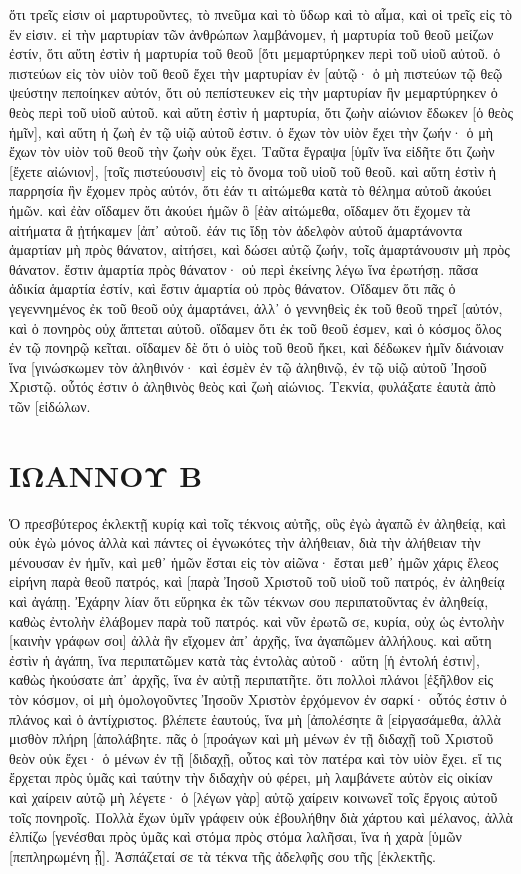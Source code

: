 ὅτι τρεῖς εἰσιν οἱ μαρτυροῦντες, 
τὸ πνεῦμα καὶ τὸ ὕδωρ καὶ τὸ αἷμα, καὶ οἱ τρεῖς εἰς τὸ ἕν εἰσιν. 
εἰ τὴν μαρτυρίαν τῶν ἀνθρώπων λαμβάνομεν, ἡ μαρτυρία τοῦ θεοῦ μείζων ἐστίν, ὅτι αὕτη ἐστὶν ἡ μαρτυρία τοῦ θεοῦ [ὅτι μεμαρτύρηκεν περὶ τοῦ υἱοῦ αὐτοῦ. 
ὁ πιστεύων εἰς τὸν υἱὸν τοῦ θεοῦ ἔχει τὴν μαρτυρίαν ἐν [αὑτῷ· ὁ μὴ πιστεύων τῷ θεῷ ψεύστην πεποίηκεν αὐτόν, ὅτι οὐ πεπίστευκεν εἰς τὴν μαρτυρίαν ἣν μεμαρτύρηκεν ὁ θεὸς περὶ τοῦ υἱοῦ αὐτοῦ. 
καὶ αὕτη ἐστὶν ἡ μαρτυρία, ὅτι ζωὴν αἰώνιον ἔδωκεν [ὁ θεὸς ἡμῖν], καὶ αὕτη ἡ ζωὴ ἐν τῷ υἱῷ αὐτοῦ ἐστιν. 
ὁ ἔχων τὸν υἱὸν ἔχει τὴν ζωήν· ὁ μὴ ἔχων τὸν υἱὸν τοῦ θεοῦ τὴν ζωὴν οὐκ ἔχει. 
Ταῦτα ἔγραψα [ὑμῖν ἵνα εἰδῆτε ὅτι ζωὴν [ἔχετε αἰώνιον], [τοῖς πιστεύουσιν] εἰς τὸ ὄνομα τοῦ υἱοῦ τοῦ θεοῦ. 
καὶ αὕτη ἐστὶν ἡ παρρησία ἣν ἔχομεν πρὸς αὐτόν, ὅτι ἐάν τι αἰτώμεθα κατὰ τὸ θέλημα αὐτοῦ ἀκούει ἡμῶν. 
καὶ ἐὰν οἴδαμεν ὅτι ἀκούει ἡμῶν ὃ [ἐὰν αἰτώμεθα, οἴδαμεν ὅτι ἔχομεν τὰ αἰτήματα ἃ ᾐτήκαμεν [ἀπ᾽ αὐτοῦ. 
ἐάν τις ἴδῃ τὸν ἀδελφὸν αὐτοῦ ἁμαρτάνοντα ἁμαρτίαν μὴ πρὸς θάνατον, αἰτήσει, καὶ δώσει αὐτῷ ζωήν, τοῖς ἁμαρτάνουσιν μὴ πρὸς θάνατον. ἔστιν ἁμαρτία πρὸς θάνατον· οὐ περὶ ἐκείνης λέγω ἵνα ἐρωτήσῃ. 
πᾶσα ἀδικία ἁμαρτία ἐστίν, καὶ ἔστιν ἁμαρτία οὐ πρὸς θάνατον. 
Οἴδαμεν ὅτι πᾶς ὁ γεγεννημένος ἐκ τοῦ θεοῦ οὐχ ἁμαρτάνει, ἀλλ᾽ ὁ γεννηθεὶς ἐκ τοῦ θεοῦ τηρεῖ [αὐτόν, καὶ ὁ πονηρὸς οὐχ ἅπτεται αὐτοῦ. 
οἴδαμεν ὅτι ἐκ τοῦ θεοῦ ἐσμεν, καὶ ὁ κόσμος ὅλος ἐν τῷ πονηρῷ κεῖται. 
οἴδαμεν δὲ ὅτι ὁ υἱὸς τοῦ θεοῦ ἥκει, καὶ δέδωκεν ἡμῖν διάνοιαν ἵνα [γινώσκωμεν τὸν ἀληθινόν· καὶ ἐσμὲν ἐν τῷ ἀληθινῷ, ἐν τῷ υἱῷ αὐτοῦ Ἰησοῦ Χριστῷ. οὗτός ἐστιν ὁ ἀληθινὸς θεὸς καὶ ζωὴ αἰώνιος. 
Τεκνία, φυλάξατε ἑαυτὰ ἀπὸ τῶν [εἰδώλων. 
\section{ΙΩΑΝΝΟΥ Β}
Ὁ πρεσβύτερος ἐκλεκτῇ κυρίᾳ καὶ τοῖς τέκνοις αὐτῆς, οὓς ἐγὼ ἀγαπῶ ἐν ἀληθείᾳ, καὶ οὐκ ἐγὼ μόνος ἀλλὰ καὶ πάντες οἱ ἐγνωκότες τὴν ἀλήθειαν, 
διὰ τὴν ἀλήθειαν τὴν μένουσαν ἐν ἡμῖν, καὶ μεθ᾽ ἡμῶν ἔσται εἰς τὸν αἰῶνα· 
ἔσται μεθ᾽ ἡμῶν χάρις ἔλεος εἰρήνη παρὰ θεοῦ πατρός, καὶ [παρὰ Ἰησοῦ Χριστοῦ τοῦ υἱοῦ τοῦ πατρός, ἐν ἀληθείᾳ καὶ ἀγάπῃ. 
Ἐχάρην λίαν ὅτι εὕρηκα ἐκ τῶν τέκνων σου περιπατοῦντας ἐν ἀληθείᾳ, καθὼς ἐντολὴν ἐλάβομεν παρὰ τοῦ πατρός. 
καὶ νῦν ἐρωτῶ σε, κυρία, οὐχ ὡς ἐντολὴν [καινὴν γράφων σοι] ἀλλὰ ἣν εἴχομεν ἀπ᾽ ἀρχῆς, ἵνα ἀγαπῶμεν ἀλλήλους. 
καὶ αὕτη ἐστὶν ἡ ἀγάπη, ἵνα περιπατῶμεν κατὰ τὰς ἐντολὰς αὐτοῦ· αὕτη [ἡ ἐντολή ἐστιν], καθὼς ἠκούσατε ἀπ᾽ ἀρχῆς, ἵνα ἐν αὐτῇ περιπατῆτε. 
ὅτι πολλοὶ πλάνοι [ἐξῆλθον εἰς τὸν κόσμον, οἱ μὴ ὁμολογοῦντες Ἰησοῦν Χριστὸν ἐρχόμενον ἐν σαρκί· οὗτός ἐστιν ὁ πλάνος καὶ ὁ ἀντίχριστος. 
βλέπετε ἑαυτούς, ἵνα μὴ [ἀπολέσητε ἃ [εἰργασάμεθα, ἀλλὰ μισθὸν πλήρη [ἀπολάβητε. 
πᾶς ὁ [προάγων καὶ μὴ μένων ἐν τῇ διδαχῇ τοῦ Χριστοῦ θεὸν οὐκ ἔχει· ὁ μένων ἐν τῇ [διδαχῇ, οὗτος καὶ τὸν πατέρα καὶ τὸν υἱὸν ἔχει. 
εἴ τις ἔρχεται πρὸς ὑμᾶς καὶ ταύτην τὴν διδαχὴν οὐ φέρει, μὴ λαμβάνετε αὐτὸν εἰς οἰκίαν καὶ χαίρειν αὐτῷ μὴ λέγετε· 
ὁ [λέγων γὰρ] αὐτῷ χαίρειν κοινωνεῖ τοῖς ἔργοις αὐτοῦ τοῖς πονηροῖς. 
Πολλὰ ἔχων ὑμῖν γράφειν οὐκ ἐβουλήθην διὰ χάρτου καὶ μέλανος, ἀλλὰ ἐλπίζω [γενέσθαι πρὸς ὑμᾶς καὶ στόμα πρὸς στόμα λαλῆσαι, ἵνα ἡ χαρὰ [ὑμῶν [πεπληρωμένη ᾖ]. 
Ἀσπάζεταί σε τὰ τέκνα τῆς ἀδελφῆς σου τῆς [ἐκλεκτῆς. 

